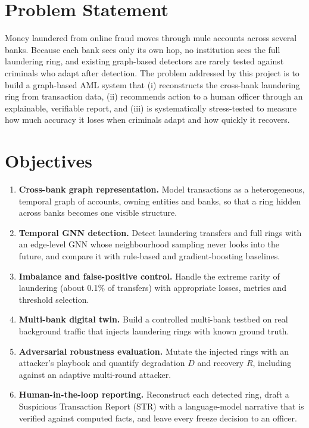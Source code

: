 \section{Problem Statement}
Money laundered from online fraud moves through mule accounts across several banks. Because each bank sees only its own hop, no institution sees the full laundering ring, and existing graph-based detectors are rarely tested against criminals who adapt after detection. The problem addressed by this project is to build a graph-based AML system that (i) reconstructs the cross-bank laundering ring from transaction data, (ii) recommends action to a human officer through an explainable, verifiable report, and (iii) is systematically stress-tested to measure how much accuracy it loses when criminals adapt and how quickly it recovers.

\section{Objectives}
\begin{enumerate}
    \item \textbf{Cross-bank graph representation.} Model transactions as a heterogeneous, temporal graph of accounts, owning entities and banks, so that a ring hidden across banks becomes one visible structure.
    \item \textbf{Temporal GNN detection.} Detect laundering transfers and full rings with an edge-level GNN whose neighbourhood sampling never looks into the future, and compare it with rule-based and gradient-boosting baselines.
    \item \textbf{Imbalance and false-positive control.} Handle the extreme rarity of laundering (about 0.1\% of transfers) with appropriate losses, metrics and threshold selection.
    \item \textbf{Multi-bank digital twin.} Build a controlled multi-bank testbed on real background traffic that injects laundering rings with known ground truth.
    \item \textbf{Adversarial robustness evaluation.} Mutate the injected rings with an attacker's playbook and quantify degradation $D$ and recovery $R$, including against an adaptive multi-round attacker.
    \item \textbf{Human-in-the-loop reporting.} Reconstruct each detected ring, draft a Suspicious Transaction Report (STR) with a language-model narrative that is verified against computed facts, and leave every freeze decision to an officer.
\end{enumerate}


